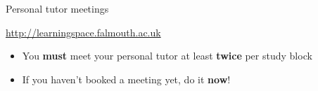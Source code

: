 \begin{frame}{Personal tutor meetings}
	\begin{center}
		\url{http://learningspace.falmouth.ac.uk}
	\end{center}
	\begin{itemize}
		\item You \textbf{must} meet your personal tutor at least \textbf{twice} per study block
		\item If you haven't booked a meeting yet, do it \textbf{now}!
	\end{itemize}
\end{frame}

